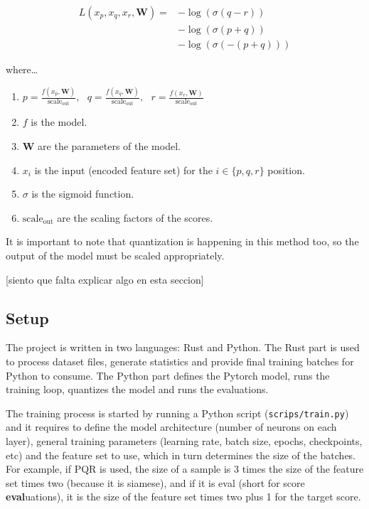 \begin{align*}
L(x_p, x_q, x_r, \bm{W})=
& -\log\left(\sigma(q - r)\right) \\
& -\log\left(\sigma(p + q)\right) \\
& -\log\left(\sigma(-(p + q))\right)
\end{align*}

where\dots

\begin{enumerate}
\itemsep0em
\item $
p = \frac{f(x_p, \bm{W})}{\text{scale}_{\text{out}}},\text{ }
q = \frac{f(x_q, \bm{W})}{\text{scale}_{\text{out}}},\text{ }
r = \frac{f(x_r, \bm{W})}{\text{scale}_{\text{out}}}
$
\item $f$ is the model.
\item $\bm{W}$ are the parameters of the model.
\item $x_i$ is the input (encoded feature set) for the $i \in \{p,q,r\}$ position.
\item $\sigma$ is the sigmoid function.
\item $\text{scale}_{\text{out}}$ are the scaling factors of the scores.
\end{enumerate}

It is important to note that quantization is happening in this method too, so the output of the model must be scaled appropriately.

[siento que falta explicar algo en esta seccion]

\subsection{Setup}


The project is written in two languages: Rust and Python. The Rust part is used to process dataset files, generate statistics and provide final training batches for Python to consume. The Python part defines the Pytorch model, runs the training loop, quantizes the model and runs the evaluations.

The training process is started by running a Python script (\texttt{scrips/train.py}) and it requires to define the model architecture (number of neurons on each layer), general training parameters (learning rate, batch size, epochs, checkpoints, etc) and the feature set to use, which in turn determines the size of the batches. For example, if PQR is used, the size of a sample is 3 times the size of the feature set times two (because it is siamese), and if it is eval (short for score \textbf{eval}uations), it is the size of the feature set times two plus 1 for the target score.

